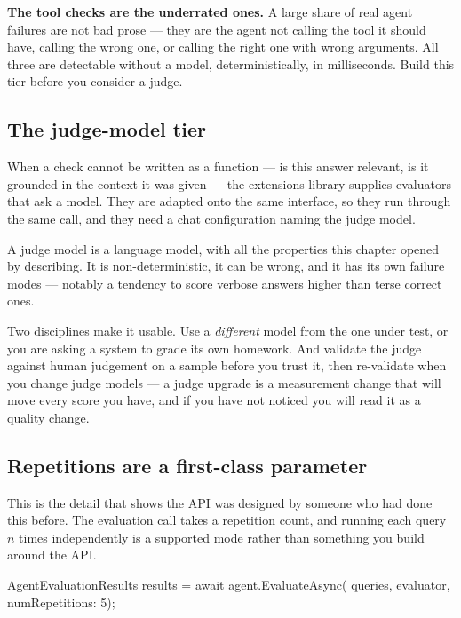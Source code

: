 \begin{note}
\textbf{The tool checks are the underrated ones.} A large share of real agent
failures are not bad prose --- they are the agent not calling the tool it should
have, calling the wrong one, or calling the right one with wrong arguments. All
three are detectable without a model, deterministically, in milliseconds. Build
this tier before you consider a judge.
\end{note}

\subsection{The judge-model tier}

When a check cannot be written as a function --- is this answer relevant, is it
grounded in the context it was given --- the extensions library supplies
evaluators that ask a model. They are adapted onto the same interface, so they
run through the same call, and they need a chat configuration naming the judge
model.

\begin{warning}
A judge model is a language model, with all the properties this chapter opened
by describing. It is non-deterministic, it can be wrong, and it has its own
failure modes --- notably a tendency to score verbose answers higher than terse
correct ones.

Two disciplines make it usable. Use a \emph{different} model from the one under
test, or you are asking a system to grade its own homework. And validate the
judge against human judgement on a sample before you trust it, then re-validate
when you change judge models --- a judge upgrade is a measurement change that
will move every score you have, and if you have not noticed you will read it as a
quality change.
\end{warning}

\subsection{Repetitions are a first-class parameter}

This is the detail that shows the API was designed by someone who had done this
before. The evaluation call takes a repetition count, and running each query $n$
times independently is a supported mode rather than something you build around
the API.

\begin{csharp}[caption={Measuring consistency, not just quality}, label={lst:eval-reps}]
AgentEvaluationResults results = await agent.EvaluateAsync(
    queries, evaluator, numRepetitions: 5);
\end{csharp}

